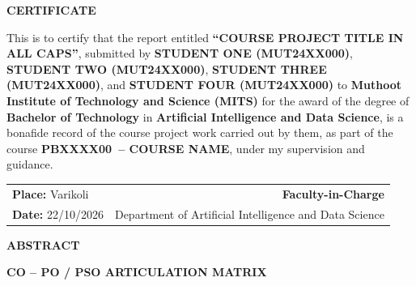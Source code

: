 \documentclass[12pt,a4paper]{report}
\newcommand{\projecttitle}{COURSE PROJECT TITLE IN ALL CAPS}
\newcommand{\coursecode}{PBXXXX00}
\newcommand{\coursename}{COURSE NAME}
\newcommand{\degree}{Bachelor of Technology}
\newcommand{\branch}{Artificial Intelligence and Data Science}
\newcommand{\department}{Department of Artificial Intelligence and Data Science}
\newcommand{\institution}{Muthoot Institute of Technology and Science (MITS)}
\begin{document}
\newpage
\thispagestyle{empty}

\begin{center}
    \vspace*{1.0cm}
    {\Large\bfseries CERTIFICATE \par}
    \vspace{1.2cm}
\end{center}

\noindent This is to certify that the report entitled \textbf{``\projecttitle''}, submitted by \textbf{STUDENT ONE (MUT24XX000)}, \textbf{STUDENT TWO (MUT24XX000)}, \textbf{STUDENT THREE (MUT24XX000)}, and \textbf{STUDENT FOUR (MUT24XX000)} to \textbf{\institution} for the award of the degree of \textbf{\degree} in \textbf{\branch}, is a bonafide record of the course project work carried out by them, as part of the course \textbf{\coursecode\ -- \coursename}, under my supervision and guidance.

\vspace{3.2cm}

\noindent
\begin{tabularx}{\textwidth}{@{}X r@{}}
\textbf{Place:} Varikoli & \textbf{Faculty-in-Charge} \\
\textbf{Date:} 22/10/2026 & \department
\end{tabularx}

\newpage
{}
\setcounter{page}{2}

\begin{center}
    {\large\bfseries ABSTRACT \par}
    \vspace{0.2cm}
\end{center}


\vspace{0.5cm}
\begin{center}
    {\large\bfseries CO -- PO / PSO ARTICULATION MATRIX \par}
    \vspace{0.2cm}
\end{center}
\end{document}

